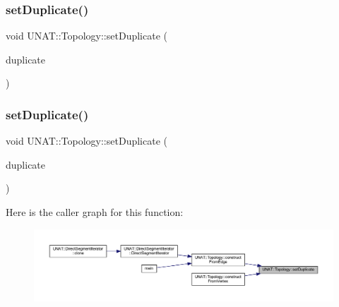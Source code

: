 \mbox{\label{classUNAT_1_1Topology_a786790063b5399bb3bb8b6fc6761ca5a}} 
\subsubsection{\texorpdfstring{setDuplicate()}{setDuplicate()}\hspace{0.1cm}{\footnotesize\ttfamily [1/3]}}
{\footnotesize\ttfamily void U\+N\+A\+T\+::\+Topology\+::set\+Duplicate (\begin{DoxyParamCaption}\item[{\mbox{\hyperlink{include_2swMacro_8h_a113cf5f6b5377cdf3fac6aa4e443e9aa}{sw\+Int}}}]{duplicate }\end{DoxyParamCaption})\hspace{0.3cm}{\ttfamily [inline]}}

\mbox{\label{classUNAT_1_1Topology_a786790063b5399bb3bb8b6fc6761ca5a}} 
\subsubsection{\texorpdfstring{setDuplicate()}{setDuplicate()}\hspace{0.1cm}{\footnotesize\ttfamily [2/3]}}
{\footnotesize\ttfamily void U\+N\+A\+T\+::\+Topology\+::set\+Duplicate (\begin{DoxyParamCaption}\item[{\mbox{\hyperlink{include_2swMacro_8h_a113cf5f6b5377cdf3fac6aa4e443e9aa}{sw\+Int}}}]{duplicate }\end{DoxyParamCaption})\hspace{0.3cm}{\ttfamily [inline]}}

Here is the caller graph for this function\+:
\nopagebreak
\begin{figure}[H]
\begin{center}
\leavevmode
\includegraphics[width=350pt]{classUNAT_1_1Topology_a786790063b5399bb3bb8b6fc6761ca5a_icgraph}
\end{center}
\end{figure}
\mbox{\label{classUNAT_1_1Topology_a786790063b5399bb3bb8b6fc6761ca5a}} 
